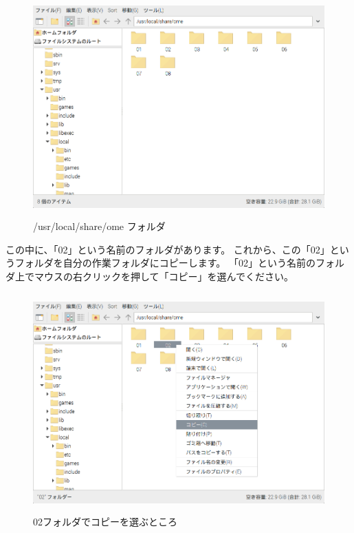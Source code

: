 \begin{figure}[H]
  \begin{center}
    \includegraphics[keepaspectratio,width=11.232cm,height=8.424cm]{images/chap02/s_ome02a.png}
    \caption{/usr/local/share/ome フォルダ}
  \end{center}
  \label{fig:folder_ome}
\end{figure}

\noindent
この中に、「02」という名前のフォルダがあります。
これから、この「02」というフォルダを自分の作業フォルダにコピーします。
「02」という名前のフォルダ上でマウスの右クリックを押して「コピー」を選んでください。

\begin{figure}[H]
  \begin{center}
    \includegraphics[keepaspectratio,width=11.232cm,height=8.424cm]{images/chap02/s_ome02b.png}
    \caption{02フォルダでコピーを選ぶところ}
  \end{center}
  \label{fig:folder_02copy}
\end{figure}


